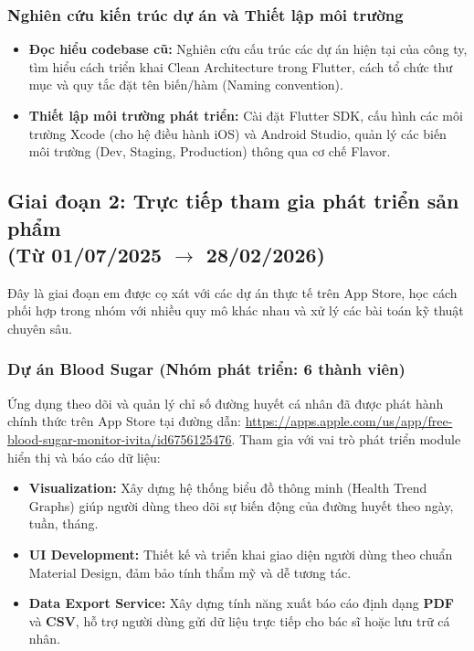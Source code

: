 \documentclass[12pt, a4paper]{article}
\begin{document}
\subsubsection{Nghiên cứu kiến trúc dự án và Thiết lập môi trường}
\begin{itemize}
    \item \textbf{Đọc hiểu codebase cũ:} Nghiên cứu cấu trúc các dự án hiện tại của công ty, tìm hiểu cách triển khai Clean Architecture trong Flutter, cách tổ chức thư mục và quy tắc đặt tên biến/hàm (Naming convention).
    \item \textbf{Thiết lập môi trường phát triển:} Cài đặt Flutter SDK, cấu hình các môi trường Xcode (cho hệ điều hành iOS) và Android Studio, quản lý các biến môi trường (Dev, Staging, Production) thông qua cơ chế Flavor.
\end{itemize}

\subsection[Giai đoạn 2: Trực tiếp tham gia phát triển sản phẩm (Từ 01/07/2025 đến 28/02/2026)]{Giai đoạn 2: Trực tiếp tham gia phát triển sản phẩm \\(Từ 01/07/2025 $\rightarrow$ 28/02/2026)}
Đây là giai đoạn em được cọ xát với các dự án thực tế trên App Store, học cách phối hợp trong nhóm với nhiều quy mô khác nhau và xử lý các bài toán kỹ thuật chuyên sâu.
\subsubsection{Dự án Blood Sugar (Nhóm phát triển: 6 thành viên)}
Ứng dụng theo dõi và quản lý chỉ số đường huyết cá nhân đã được phát hành chính thức trên App Store tại đường dẫn: \url{https://apps.apple.com/us/app/free-blood-sugar-monitor-ivita/id6756125476}.
Tham gia với vai trò phát triển module hiển thị và báo cáo dữ liệu:
\begin{itemize}
    \item \textbf{Visualization:} Xây dựng hệ thống biểu đồ thông minh (Health Trend Graphs) giúp người dùng theo dõi sự biến động của đường huyết theo ngày, tuần, tháng.
    \item \textbf{UI Development:} Thiết kế và triển khai giao diện người dùng theo chuẩn Material Design, đảm bảo tính thẩm mỹ và dễ tương tác.
    \item \textbf{Data Export Service:} Xây dựng tính năng xuất báo cáo định dạng \textbf{PDF} và \textbf{CSV}, hỗ trợ người dùng gửi dữ liệu trực tiếp cho bác sĩ hoặc lưu trữ cá nhân.
\end{itemize}
\end{document}
